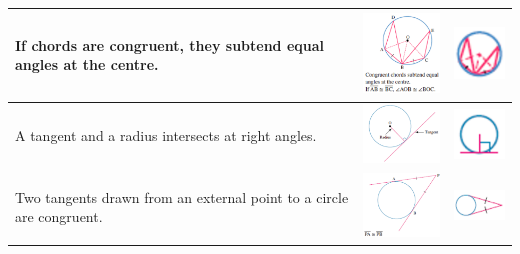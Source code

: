 \documentclass{book}
\begin{document}
\begin{center}
\begin{tabular}[center]{|p{5cm}|p{3cm}|p{2cm}|}
		If chords are congruent, they subtend equal angles at the centre.                                                                                                                        & \includegraphics[width=3cm]{circle theorem 7}  & \includegraphics[width=2cm]{circle theorem 7 symbol}  \\ \hline
		A tangent and a radius intersects at right angles.                                                                                                                                       & \includegraphics[width=3cm]{circle theorem 8}  & \includegraphics[width=2cm]{circle theorem 8 symbol}  \\ \hline
		Two tangents drawn from an external point to a circle are congruent.                                                                                                                     & \includegraphics[width=3cm]{circle theorem 9}  & \includegraphics[width=2cm]{circle theorem 9 symbol}  \\ \hline

\end{tabular}
\end{center}
\end{document}
